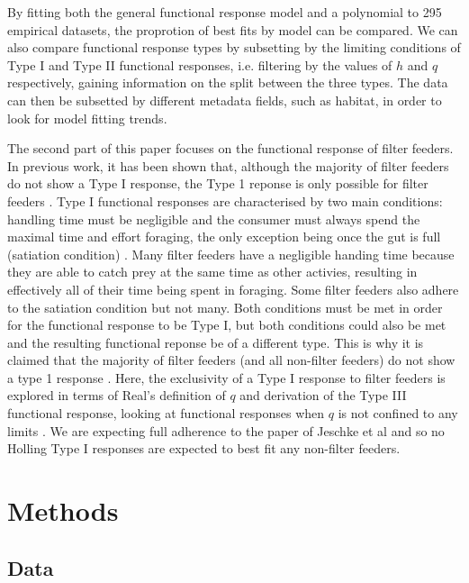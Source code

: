 \documentclass[11pt, a4paper, titlepage]{article}
\begin{document}
By fitting both the general functional response model and a polynomial to 295 empirical datasets, the proprotion of best fits by model can be compared.  We can also compare functional response types by subsetting by the limiting conditions of Type I and Type II functional responses, i.e. filtering by the values of $h$ and $q$ respectively, gaining information on the split between the three types.  The data can then be subsetted by different metadata fields, such as habitat, in order to look for model fitting trends.

The second part of this paper focuses on the functional response of  filter feeders. In previous work, it has been shown that, although the majority of filter feeders do not show a Type I response, the Type 1 reponse is only possible for filter feeders \parencite{Jeschke2004}.  Type I functional responses are characterised by two main conditions: handling time must be negligible and the consumer must always spend the maximal time and effort foraging, the only exception being once the gut is full (satiation condition) \parencite{Jeschke2002}. Many filter feeders have a negligible handing time because they are able to catch prey at the same time as other activies, resulting in effectively all of their time being spent in foraging. Some filter feeders also adhere to the satiation condition but not many. Both conditions must be met in order for the functional response to be Type I, but both conditions could also be met and the resulting functional reponse be of a different type. This is why it is claimed that the majority of filter feeders (and all non-filter feeders) do not show a type 1 response \parencite{Jeschke2004, Deville2013, Porter1983}. Here, the exclusivity of a Type I response to filter feeders is explored in terms of Real's definition of $q$ and derivation of the Type III functional response, looking at functional responses when $q$ is not confined to any limits \parencite{Real1977}. We are expecting full adherence to the paper of Jeschke et al and so no Holling Type I responses are expected to best fit any non-filter feeders.




\section{Methods}

\subsection{Data}
\end{document}
